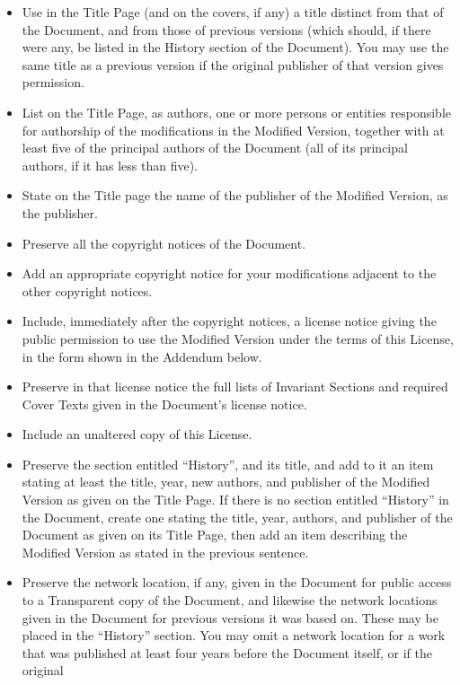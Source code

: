 \documentclass[12pt,twoside,openright,a4paper]{book}
\begin{document}
	\begin{itemize}

	\item Use in the Title Page (and on the covers, if any) a title distinct
	from that of the Document, and from those of previous versions
	(which should, if there were any, be listed in the History section
	of the Document).  You may use the same title as a previous version
	if the original publisher of that version gives permission.
	\item List on the Title Page, as authors, one or more persons or entities
	responsible for authorship of the modifications in the Modified
	Version, together with at least five of the principal authors of the
	Document (all of its principal authors, if it has less than five).
	\item State on the Title page the name of the publisher of the
	Modified Version, as the publisher.
	\item Preserve all the copyright notices of the Document.
	\item Add an appropriate copyright notice for your modifications
	adjacent to the other copyright notices.
	\item Include, immediately after the copyright notices, a license notice
	giving the public permission to use the Modified Version under the
	terms of this License, in the form shown in the Addendum below.
	\item Preserve in that license notice the full lists of Invariant Sections
	and required Cover Texts given in the Document's license notice.
	\item Include an unaltered copy of this License.
	\item Preserve the section entitled ``History'', and its title, and add to
	it an item stating at least the title, year, new authors, and
	publisher of the Modified Version as given on the Title Page.  If
	there is no section entitled ``History'' in the Document, create one
	stating the title, year, authors, and publisher of the Document as
	given on its Title Page, then add an item describing the Modified
	Version as stated in the previous sentence.
	\item Preserve the network location, if any, given in the Document for
	public access to a Transparent copy of the Document, and likewise
	the network locations given in the Document for previous versions
	it was based on.  These may be placed in the ``History'' section.
	You may omit a network location for a work that was published at
	least four years before the Document itself, or if the original

\end{itemize}
\end{document}
